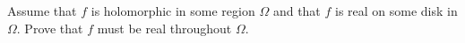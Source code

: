 Assume that $f$ is holomorphic in some region $\Omega$ and that $f$ is
real on some disk in $\Omega$. Prove that $f$ must be real throughout
$\Omega$.
